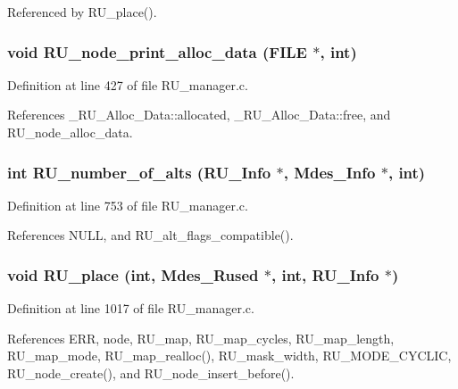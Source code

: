 Referenced by RU\_\-place().
\subsubsection{\setlength{\rightskip}{0pt plus 5cm}void RU\_\-node\_\-print\_\-alloc\_\-data (FILE $\ast$, int)}\label{RU__manager_8h_c7baefae90da3f1ca772414f485eb84b}




Definition at line 427 of file RU\_\-manager.c.

References \_\-RU\_\-Alloc\_\-Data::allocated, \_\-RU\_\-Alloc\_\-Data::free, and RU\_\-node\_\-alloc\_\-data.
\subsubsection{\setlength{\rightskip}{0pt plus 5cm}int RU\_\-number\_\-of\_\-alts (\bf{RU\_\-Info} $\ast$, Mdes\_\-Info $\ast$, int)}\label{RU__manager_8h_147238fe2f1f61c3f177c0305c46e3ac}




Definition at line 753 of file RU\_\-manager.c.

References NULL, and RU\_\-alt\_\-flags\_\-compatible().
\subsubsection{\setlength{\rightskip}{0pt plus 5cm}void RU\_\-place (int, Mdes\_\-Rused $\ast$, int, \bf{RU\_\-Info} $\ast$)}\label{RU__manager_8h_f0190ae26dbcaaa382458120fbe5a2fc}




Definition at line 1017 of file RU\_\-manager.c.

References ERR, node, RU\_\-map, RU\_\-map\_\-cycles, RU\_\-map\_\-length, RU\_\-map\_\-mode, RU\_\-map\_\-realloc(), RU\_\-mask\_\-width, RU\_\-MODE\_\-CYCLIC, RU\_\-node\_\-create(), and RU\_\-node\_\-insert\_\-before().
